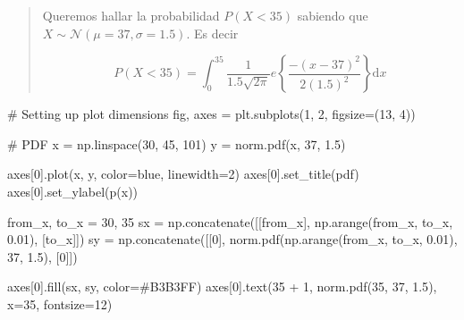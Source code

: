 \documentclass[
  letterpaper,
  DIV=11,
  numbers=noendperiod]{scrartcl}
\newenvironment{Shaded}{\begin{snugshade}}{\end{snugshade}}
\newcommand{\CommentTok}[1]{\textcolor[rgb]{0.37,0.37,0.37}{#1}}
\newcommand{\DecValTok}[1]{\textcolor[rgb]{0.68,0.00,0.00}{#1}}
\newcommand{\FloatTok}[1]{\textcolor[rgb]{0.68,0.00,0.00}{#1}}
\newcommand{\NormalTok}[1]{\textcolor[rgb]{0.00,0.23,0.31}{#1}}
\newcommand{\OperatorTok}[1]{\textcolor[rgb]{0.37,0.37,0.37}{#1}}
\newcommand{\StringTok}[1]{\textcolor[rgb]{0.13,0.47,0.30}{#1}}
\begin{document}
\begin{quote}
Queremos hallar la probabilidad \(P(X<35)\) sabiendo que
\(X\sim \mathcal{N}(\mu=37, \sigma=1.5)\). Es decir

\[
 P(X<35)=\int_{0}^{35}\frac{1}{1.5 \sqrt{2\pi}} e\left\{\frac{-(x-37)^2}{2(1.5)^2}\right\}\text{d}x
\]
\end{quote}

\begin{Shaded}
\begin{Highlighting}[]
\CommentTok{\# Setting up plot dimensions}
\NormalTok{fig, axes }\OperatorTok{=}\NormalTok{ plt.subplots(}\DecValTok{1}\NormalTok{, }\DecValTok{2}\NormalTok{, figsize}\OperatorTok{=}\NormalTok{(}\DecValTok{13}\NormalTok{, }\DecValTok{4}\NormalTok{))}

\CommentTok{\# PDF}
\NormalTok{x }\OperatorTok{=}\NormalTok{ np.linspace(}\DecValTok{30}\NormalTok{, }\DecValTok{45}\NormalTok{, }\DecValTok{101}\NormalTok{)}
\NormalTok{y }\OperatorTok{=}\NormalTok{ norm.pdf(x, }\DecValTok{37}\NormalTok{, }\FloatTok{1.5}\NormalTok{)}

\NormalTok{axes[}\DecValTok{0}\NormalTok{].plot(x, y, color}\OperatorTok{=}\StringTok{\textquotesingle{}blue\textquotesingle{}}\NormalTok{, linewidth}\OperatorTok{=}\DecValTok{2}\NormalTok{)}
\NormalTok{axes[}\DecValTok{0}\NormalTok{].set\_title(}\StringTok{\textquotesingle{}pdf\textquotesingle{}}\NormalTok{)}
\NormalTok{axes[}\DecValTok{0}\NormalTok{].set\_ylabel(}\StringTok{\textquotesingle{}p(x)\textquotesingle{}}\NormalTok{)}

\NormalTok{from\_x, to\_x }\OperatorTok{=} \DecValTok{30}\NormalTok{, }\DecValTok{35}
\NormalTok{sx }\OperatorTok{=}\NormalTok{ np.concatenate([[from\_x], np.arange(from\_x, to\_x, }\FloatTok{0.01}\NormalTok{), [to\_x]])}
\NormalTok{sy }\OperatorTok{=}\NormalTok{ np.concatenate([[}\DecValTok{0}\NormalTok{], norm.pdf(np.arange(from\_x, to\_x, }\FloatTok{0.01}\NormalTok{), }\DecValTok{37}\NormalTok{, }\FloatTok{1.5}\NormalTok{), [}\DecValTok{0}\NormalTok{]])}

\NormalTok{axes[}\DecValTok{0}\NormalTok{].fill(sx, sy, color}\OperatorTok{=}\StringTok{\textquotesingle{}\#B3B3FF\textquotesingle{}}\NormalTok{)}
\NormalTok{axes[}\DecValTok{0}\NormalTok{].text(}\DecValTok{35} \OperatorTok{+} \DecValTok{1}\NormalTok{, norm.pdf(}\DecValTok{35}\NormalTok{, }\DecValTok{37}\NormalTok{, }\FloatTok{1.5}\NormalTok{), }\StringTok{\textquotesingle{}x=35\textquotesingle{}}\NormalTok{, fontsize}\OperatorTok{=}\DecValTok{12}\NormalTok{)}


\end{Highlighting}
\end{Shaded}
\end{document}
